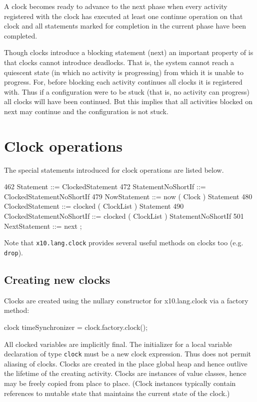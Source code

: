 A clock becomes ready to advance to the next phase when every activity
registered with the clock has executed at least one {\cf continue}
operation on that clock and all statements marked for completion in
the current phase have been completed.

Though clocks introduce a blocking statement ({\cf next}) an important
property of \Xten{} is that clocks cannot introduce deadlocks. That is,
the system cannot reach a quiescent state (in which no activity is
progressing) from which it is unable to progress. For, before blocking
each activity continues all clocks it is registered with. Thus if a
configuration were to be stuck (that is, no activity can progress) all
clocks will have been continued. But this implies that all activities
blocked on {\cf next} may continue and the configuration is not stuck.

\section{Clock operations}
The special statements introduced for clock operations are listed below.
\begin{x10}
462 Statement ::= ClockedStatement
472 StatementNoShortIf ::= 
      ClockedStatementNoShortIf
479 NowStatement ::= 
      now ( Clock ) Statement
480 ClockedStatement ::= 
      clocked ( ClockList ) Statement
490 ClockedStatementNoShortIf ::= 
      clocked ( ClockList ) 
         StatementNoShortIf
501 NextStatement ::= next ;
\end{x10}

Note that {\tt x10.lang.clock} provides several useful methods on
clocks too (e.g. {\tt drop}).

\subsection{Creating new clocks}
Clocks are created using the nullary constructor for {\cf
x10.lang.clock} via a factory method:

\begin{x10}
clock timeSynchronizer = clock.factory.clock();
\end{x10}

All clocked variables are implicitly final. The initializer for a
local variable declaration of type {\tt clock} must be a new clock
expression. Thus \Xten{} does not permit aliasing of clocks.
Clocks are created in the place global heap and hence outlive the
lifetime of the creating activity.  Clocks are instances of value
classes, hence may be freely copied from place to
place. (Clock instances typically contain references to mutable state
that maintains the current state of the clock.)

